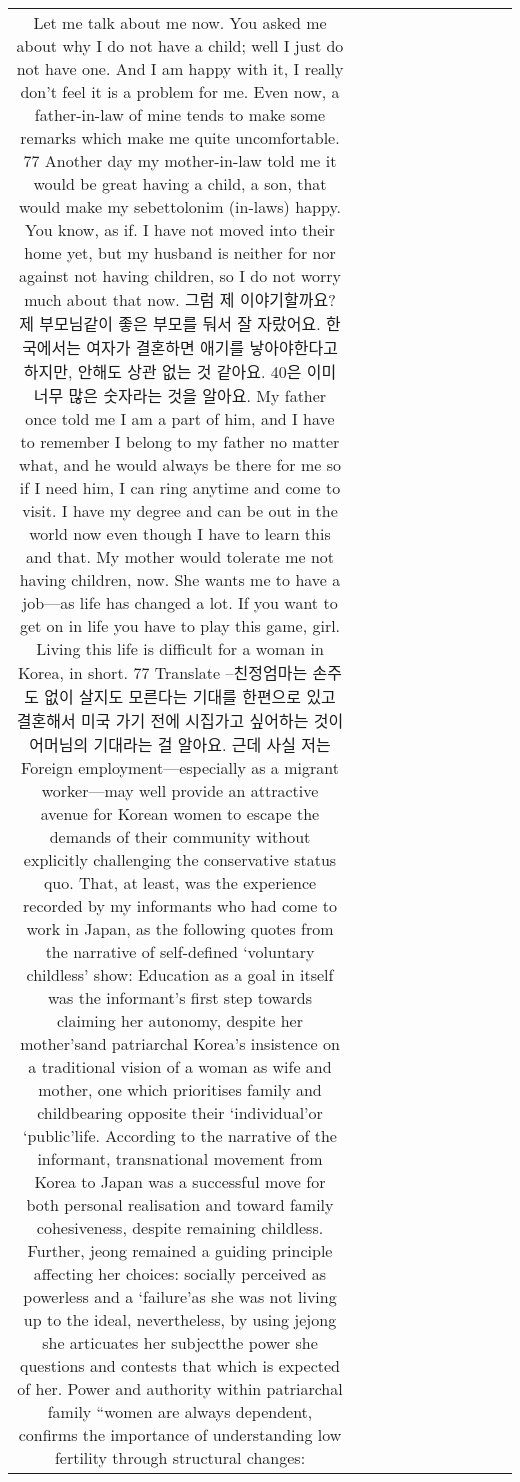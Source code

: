 \begin{table}[h!]
\begin{tabular}{|c|c|c|c|c|c|c|c|c|c|c|}
{Let me talk about me now. You asked me about why I do not have a child; well I just
do not have one. And I am happy with it, I really don’t feel it is a problem for me.
Even now, a father-in-law of mine tends to make some remarks which make me
quite uncomfortable. 77 Another day my mother-in-law told me it would be great
having a child, a son, that would make my sebettolonim (in-laws) happy. You know,
as if. I have not moved into their home yet, but my husband is neither for nor against
not having children, so I do not worry much about that now.
그럼 제 이야기할까요? 제 부모님같이 좋은 부모를 둬서 잘 자랐어요.
한국에서는 여자가 결혼하면 애기를 낳아야한다고 하지만, 안해도 상관 없는
것 같아요. 40은 이미 너무 많은 숫자라는 것을 알아요.
My father once told me I am a part of him, and I have to remember I belong to my
father no matter what, and he would always be there for me so if I need him, I can
ring anytime and come to visit. I have my degree and can be out in the world now
even though I have to learn this and that. My mother would tolerate me not having
children, now. She wants me to have a job—as life has changed a lot. If you want to
get on in life
you have to play this game, girl. Living this life is difficult for a woman
in Korea, in short.
77 Translate –친정엄마는 손주도 없이 살지도 모른다는 기대를 한편으로 있고 결혼해서 미국 가기 전에 시집가고 싶어하는 것이 어머님의 기대라는 걸 알아요. 근데 사실 저는
Foreign employment—especially as a migrant worker—may well provide an attractive avenue for Korean women to escape the demands of their community without explicitly challenging the conservative status quo. That, at least, was the experience recorded by my informants who had come to work in Japan, as the following quotes from the narrative of self-defined ‘voluntary childless’ show:
Education as a goal in itself was the informant’s first step towards claiming her autonomy, despite her mother’sand patriarchal Korea’s insistence on a traditional vision of a woman as wife and mother, one which prioritises family and childbearing opposite their ‘individual’or ‘public’life. According to the narrative of the informant, transnational movement from Korea to Japan was a successful move for both personal realisation and toward family cohesiveness, despite remaining childless. Further, jeong
remained a guiding principle affecting her choices: socially perceived as powerless and a ‘failure’as she was not living up to the ideal, nevertheless, by using jejong she articuates her subjectthe power she questions and contests that which is expected of her.
Power and authority within patriarchal family “women are always dependent, confirms the importance of understanding low fertility through structural changes:
}
\end{tabular}
\end{table}
